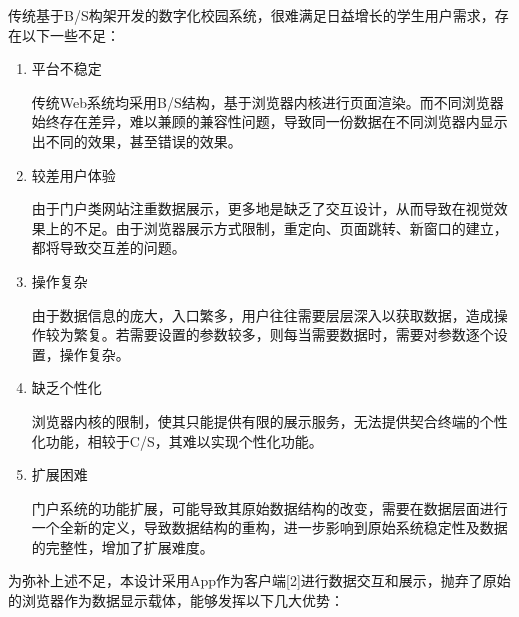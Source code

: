 \documentclass[oneside]{jufethesis}
\begin{document}
传统基于B/S构架开发的数字化校园系统，很难满足日益增长的学生用户需求，存在以下一些不足：
\begin{enumerate}[(1)]
  \item 平台不稳定

  传统Web系统均采用B/S结构，基于浏览器内核进行页面渲染。而不同浏览器始终存在差异，难以兼顾的兼容性问题，导致同一份数据在不同浏览器内显示出不同的效果，甚至错误的效果。

  \item 较差用户体验

  由于门户类网站注重数据展示，更多地是缺乏了交互设计，从而导致在视觉效果上的不足。由于浏览器展示方式限制，重定向、页面跳转、新窗口的建立，都将导致交互差的问题。

  \item 操作复杂

  由于数据信息的庞大，入口繁多，用户往往需要层层深入以获取数据，造成操作较为繁复。若需要设置的参数较多，则每当需要数据时，需要对参数逐个设置，操作复杂。

  \item 缺乏个性化

  浏览器内核的限制，使其只能提供有限的展示服务，无法提供契合终端的个性化功能，相较于C/S，其难以实现个性化功能。
  
  \item 扩展困难

  门户系统的功能扩展，可能导致其原始数据结构的改变，需要在数据层面进行一个全新的定义，导致数据结构的重构，进一步影响到原始系统稳定性及数据的完整性，增加了扩展难度。
  
\end{enumerate}

为弥补上述不足，本设计采用App作为客户端[2]进行数据交互和展示，抛弃了原始的浏览器作为数据显示载体，能够发挥以下几大优势：
\end{document}

